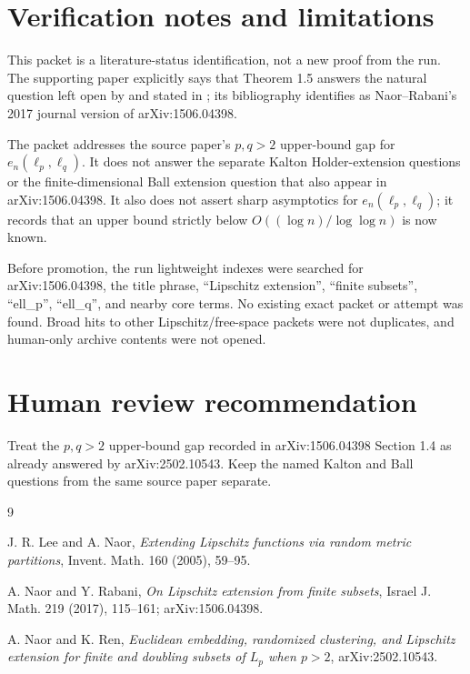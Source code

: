 \documentclass[11pt]{article}
\newcommand{\en}{e_n}
\begin{document}
\section*{Verification notes and limitations}

This packet is a literature-status identification, not a new proof from the
run.  The supporting paper explicitly says that Theorem 1.5 answers the
natural question left open by \cite{LN05} and stated in \cite{NR17}; its
bibliography identifies \cite{NR17} as Naor--Rabani's 2017 journal version of
arXiv:1506.04398.

The packet addresses the source paper's \(p,q>2\) upper-bound gap for
\(\en(\ell_p,\ell_q)\).  It does not answer the separate Kalton
Holder-extension questions or the finite-dimensional Ball extension question
that also appear in arXiv:1506.04398.  It also does not assert sharp
asymptotics for \(\en(\ell_p,\ell_q)\); it records that an upper bound
strictly below \(O((\log n)/\log\log n)\) is now known.

Before promotion, the run lightweight indexes were searched for arXiv:1506.04398,
the title phrase, ``Lipschitz extension'', ``finite subsets'', ``ell\_p'',
``ell\_q'', and nearby core terms.  No existing exact packet or attempt was
found.  Broad hits to other Lipschitz/free-space packets were not duplicates,
and human-only archive contents were not opened.

\section*{Human review recommendation}

Treat the \(p,q>2\) upper-bound gap recorded in arXiv:1506.04398 Section 1.4
as already answered by arXiv:2502.10543.  Keep the named Kalton and Ball
questions from the same source paper separate.

\begin{thebibliography}{9}

J. R. Lee and A. Naor,
\emph{Extending Lipschitz functions via random metric partitions},
Invent. Math. 160 (2005), 59--95.

A. Naor and Y. Rabani,
\emph{On Lipschitz extension from finite subsets},
Israel J. Math. 219 (2017), 115--161; arXiv:1506.04398.

A. Naor and K. Ren,
\emph{Euclidean embedding, randomized clustering, and Lipschitz extension for
finite and doubling subsets of \(L_p\) when \(p>2\)},
arXiv:2502.10543.

\end{thebibliography}
\end{document}
